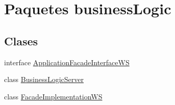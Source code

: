 \hypertarget{namespacebusiness_logic}{}\section{Paquetes business\+Logic}
\label{namespacebusiness_logic}
\subsection*{Clases}
\begin{DoxyCompactItemize}
\item 
interface \mbox{\hyperlink{interfacebusiness_logic_1_1_application_facade_interface_w_s}{Application\+Facade\+Interface\+WS}}
\item 
class \mbox{\hyperlink{classbusiness_logic_1_1_business_logic_server}{Business\+Logic\+Server}}
\item 
class \mbox{\hyperlink{classbusiness_logic_1_1_facade_implementation_w_s}{Facade\+Implementation\+WS}}
\end{DoxyCompactItemize}
